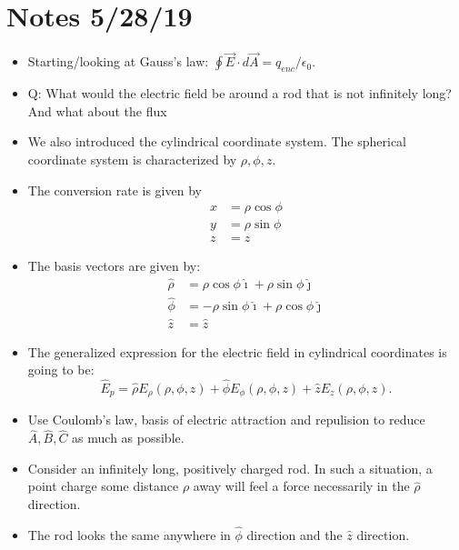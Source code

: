 \documentclass[12pt]{extreport}
\begin{document}
\section{Notes 5/28/19}
	\begin{itemize}
		\item Starting/looking at Gauss's law: $\oint \vec E \cdot d\vec A = q_{enc}/\epsilon_0.$

		\item Q: What would the electric field be around a rod that is not infinitely long? And what about the flux  

		\item We also introduced the cylindrical coordinate system. The spherical coordinate system is characterized by $\rho, \phi, z.$ 

		\item The conversion rate is given by 
			\begin{align*}
				x &= \rho \cos \phi \\
				y &= \rho \sin \phi \\
				z &= z
			\end{align*}

		\item The basis vectors are given by: 
			\begin{align*}
				\hat \rho &= \rho \cos \phi \hat \imath  + \rho \sin \phi \hat \jmath \\
				\hat \phi &= -\rho \sin \phi \hat \imath + \rho \cos \phi \hat \jmath \\
				\hat z &= \hat z
			\end{align*}

		\item The generalized expression for the electric field in cylindrical coordinates is going to be: $$\hat E_p = \hat \rho E_\rho(\rho, \phi, z) + \hat \phi E_\phi(\rho, \phi, z) + \hat z E_z (\rho, \phi, z).$$

		\item Use Coulomb's law, basis of electric attraction and repulision to reduce $\hat A, \hat B, \hat C$ as much as possible.

		\item Consider an infinitely long, positively charged rod. In such a situation, a point charge some distance $\rho$ away will feel a force necessarily in the $\hat \rho$ direction.	

		\item The rod looks the same anywhere in $\hat \phi$ direction and the $\hat z$ direction.


\end{itemize}
\end{document}
